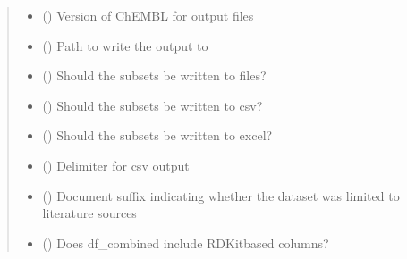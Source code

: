\documentclass[letterpaper,10pt,english]{sphinxmanual}
\begin{document}
\begin{fulllineitems}
\begin{quote}
\begin{description}
\begin{itemize}
\item {} 
\sphinxAtStartPar
{} () \textendash{} Version of ChEMBL for output files

\item {} 
\sphinxAtStartPar
{} () \textendash{} Path to write the output to

\item {} 
\sphinxAtStartPar
{} () \textendash{} Should the subsets be written to files?

\item {} 
\sphinxAtStartPar
{} () \textendash{} Should the subsets be written to csv?

\item {} 
\sphinxAtStartPar
{} () \textendash{} Should the subsets be written to excel?

\item {} 
\sphinxAtStartPar
{} () \textendash{} Delimiter for csv output

\item {} 
\sphinxAtStartPar
{} () \textendash{} Document suffix indicating whether the dataset was limited to literature sources

\item {} 
\sphinxAtStartPar
{} () \textendash{} Does df\_combined include RDKit\sphinxhyphen{}based columns?

\end{itemize}

\end{description}\end{quote}

\end{fulllineitems}

\end{document}
